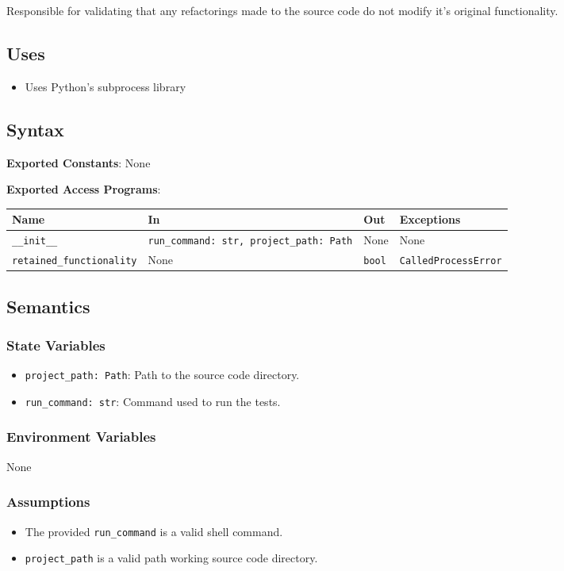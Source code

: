 \documentclass[12pt, titlepage]{article}
\begin{document}
Responsible for validating that any refactorings made to the source code do not modify it's original functionality.

\subsection{Uses}
\begin{itemize}
  \item Uses Python's subprocess library
\end{itemize}

\subsection{Syntax}
\noindent
\textbf{Exported Constants}: None

\noindent
\textbf{Exported Access Programs}:

\begin{tabularx}{\linewidth}{|l|>{\raggedright\arraybackslash}X|l|l|}
\hline
Name & In & Out & Exceptions \\
\hline
\texttt{\_\_init\_\_} & \texttt{run\_command: str, project\_path: Path} & None & None \\
\hline
\texttt{retained\_functionality} & None & \texttt{bool} & \texttt{CalledProcessError} \\
\hline
\end{tabularx}

\subsection{Semantics}

\subsubsection{State Variables}
\begin{itemize}
  \item \texttt{project\_path: Path}: Path to the source code directory.
  \item \texttt{run\_command: str}: Command used to run the tests.
\end{itemize}

\subsubsection{Environment Variables}
None

\subsubsection{Assumptions}
\begin{itemize}
  \item The provided \texttt{run\_command} is a valid shell command.
  \item \texttt{project\_path} is a valid path working source code directory.
\end{itemize}
\end{document}
